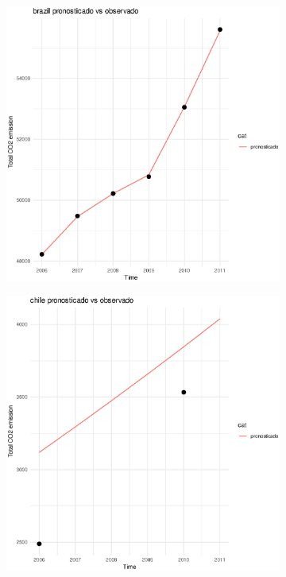 \documentclass[twocolumn]{article}
\begin{document}
\begin{figure}
\begin{subfigure}{.3\textwidth}
        \end{subfigure}
        \hspace*{\fill}
        \begin{subfigure}{.3\textwidth}
            \includegraphics[width=\linewidth]{images/brazil_imputation.eps}
        \end{subfigure}
        \hspace*{\fill}
        \begin{subfigure}{.3\textwidth}
            \includegraphics[width=\linewidth]{images/chile_imputation.eps}
        \end{subfigure}\\   
         

\end{figure}
\end{document}
